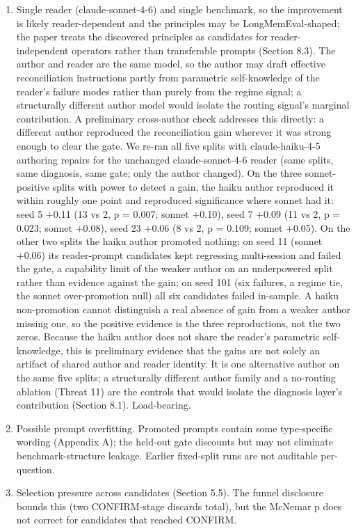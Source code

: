 \begin{enumerate}
\item Single reader (claude-sonnet-4-6) and single benchmark, so the improvement is likely reader-dependent and the principles may be LongMemEval-shaped; the paper treats the discovered principles as candidates for reader-independent operators rather than transferable prompts (Section 8.3). The author and reader are the same model, so the author may draft effective reconciliation instructions partly from parametric self-knowledge of the reader's failure modes rather than purely from the regime signal; a structurally different author model would isolate the routing signal's marginal contribution. A preliminary cross-author check addresses this directly: a different author reproduced the reconciliation gain wherever it was strong enough to clear the gate. We re-ran all five splits with claude-haiku-4-5 authoring repairs for the unchanged claude-sonnet-4-6 reader (same splits, same diagnosis, same gate; only the author changed). On the three sonnet-positive splits with power to detect a gain, the haiku author reproduced it within roughly one point and reproduced significance where sonnet had it: seed 5 +0.11 (13 vs 2, p = 0.007; sonnet +0.10), seed 7 +0.09 (11 vs 2, p = 0.023; sonnet +0.08), seed 23 +0.06 (8 vs 2, p = 0.109; sonnet +0.05). On the other two splits the haiku author promoted nothing: on seed 11 (sonnet +0.06) its reader-prompt candidates kept regressing multi-session and failed the gate, a capability limit of the weaker author on an underpowered split rather than evidence against the gain; on seed 101 (six failures, a regime tie, the sonnet over-promotion null) all six candidates failed in-sample. A haiku non-promotion cannot distinguish a real absence of gain from a weaker author missing one, so the positive evidence is the three reproductions, not the two zeros. Because the haiku author does not share the reader's parametric self-knowledge, this is preliminary evidence that the gains are not solely an artifact of shared author and reader identity. It is one alternative author on the same five splits; a structurally different author family and a no-routing ablation (Threat 11) are the controls that would isolate the diagnosis layer's contribution (Section 8.1). Load-bearing.
\item Possible prompt overfitting. Promoted prompts contain some type-specific wording (Appendix A); the held-out gate discounts but may not eliminate benchmark-structure leakage. Earlier fixed-split runs are not auditable per-question.
\item Selection pressure across candidates (Section 5.5). The funnel disclosure bounds this (two CONFIRM-stage discards total), but the McNemar p does not correct for candidates that reached CONFIRM.

\end{enumerate}
